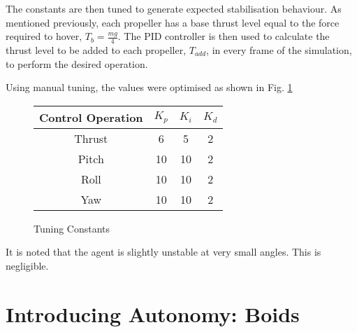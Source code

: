 \documentclass[../report.tex]{subfiles}
\begin{document}
The constants are then tuned to generate expected stabilisation behaviour. As mentioned previously, each propeller has a base thrust level equal to the force required to hover, $T_b = \frac{mg}{4}$. The PID controller is then used to calculate the thrust level to be added to each propeller, $T_{add}$, in every frame of the simulation, to perform the desired operation.

Using manual tuning, the values were optimised as shown in Fig. \ref{fig:pid-tuning}

\begin{figure}[H]
    \centering
        \begin{tabular}{| c | c | c | c |} 
        \hline
        Control Operation & $K_p$ & $K_i$ & $K_d$ \\ 
        \hline
        Thrust & 6 & 5 & 2 \\
        \hline
        Pitch & 10 & 10 & 2 \\
        \hline
        Roll & 10 & 10 & 2 \\
        \hline
        Yaw & 10 & 10 & 2 \\
        \hline
        \end{tabular}
        \caption{Tuning Constants}
        \label{fig:pid-tuning}
\end{figure}

It is noted that the agent is slightly unstable at very small angles. This is negligible.

\section{Introducing Autonomy: Boids}
 
\end{document}
